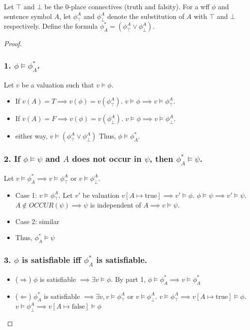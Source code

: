 \documentclass{article}
\begin{document}
Let $\top$ and $\bot$ be the 0-place connectives (truth and falsity). For a wff $\phi$ and sentence symbol $A$, let $\phi^A_{\top}$ and $\phi^A_{\bot}$ denote the substitution of $A$ with $\top$ and $\bot$ respectively. Define the formula $\phi^*_A = (\phi^A_{\top} \lor \phi^A_{\bot})$.

\begin{proof}
\subsubsection*{1. $\phi \models \phi^*_A$.}
Let $v$ be a valuation such that $v \models \phi$.
\begin{itemize}
    \item If $v(A) = T\implies v(\phi) = v(\phi^A_{\top})$.  $v \models \phi \implies v \models \phi^A_{\top}$.
    \item If $v(A) = F\implies v(\phi) = v(\phi^A_{\bot})$. $v \models \phi \implies v \models \phi^A_{\bot}$.
    \item either way, $v \models (\phi^A_{\top} \lor \phi^A_{\bot})$ Thus, $\phi \models \phi^*_A$.
\end{itemize}

\subsubsection*{2. If $\phi \models \psi$ and $A$ does not occur in $\psi$, then $\phi^*_A \models \psi$.}
Let $v \models \phi^*_A \implies v \models \phi^A_{\top}$ or $v \models \phi^A_{\bot}$.
\begin{itemize}
    \item Case 1: $v \models \phi^A_{\top}$. Let $v'$ be valuation $v[A \mapsto \text{true}] \implies v' \models \phi$. $\phi \models \psi \implies v' \models \psi$. $A \not \in OCCUR(\psi) \implies \psi$ is independent of $A \implies v \models \psi$.
    \item Case 2: similar
    \item Thus, $\phi^*_A \models \psi$
\end{itemize}

\subsubsection*{3. $\phi$ is satisfiable iff $\phi^*_A$ is satisfiable.}
\begin{itemize}
    \item ($\Rightarrow$) $\phi$ is satisfiable $ \implies \exists v \models \phi$. By part 1, $\phi \models \phi^*_A \implies v \models \phi^*_A$
    \item ($\Leftarrow$) $\phi^*_A$ is satisfiable $\implies \exists v, v \models \phi^A_{\top}$ or $v \models \phi^A_{\bot}$. $v \models \phi^A_{\top} \implies v[A \mapsto \text{true}] \models \phi$. $v \models \phi^A_{\bot} \implies v[A \mapsto \text{false}] \models \phi$
\end{itemize}
\end{proof}
\end{document}
